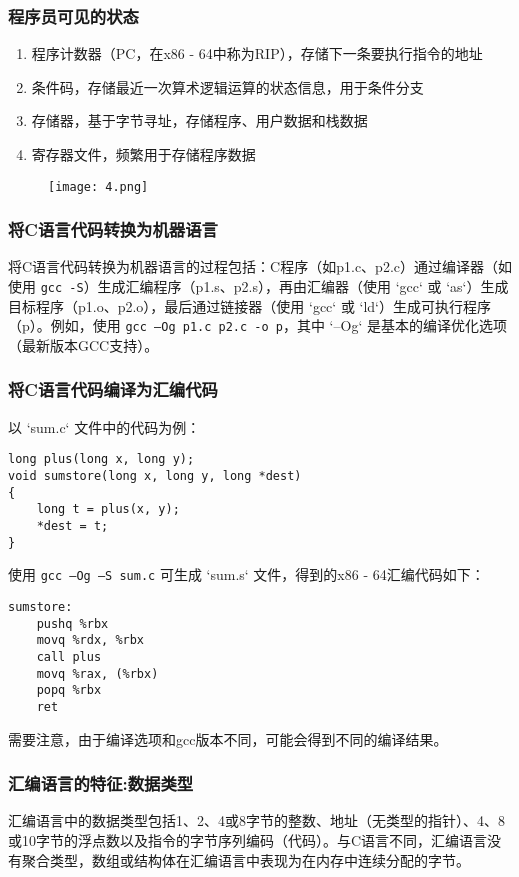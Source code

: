 \subsubsection{程序员可见的状态}
\begin{enumerate}
    \item 程序计数器（PC，在x86 - 64中称为RIP），存储下一条要执行指令的地址
    \item 条件码，存储最近一次算术逻辑运算的状态信息，用于条件分支
    \item 存储器，基于字节寻址，存储程序、用户数据和栈数据
    \item 寄存器文件，频繁用于存储程序数据
\end{enumerate}

\begin{figure}[H]
    \centering
    \captionsetup{skip=4pt}
    \texttt{[image: 4.png]}
    \caption{} 
\end{figure}

\subsubsection{将C语言代码转换为机器语言}
将C语言代码转换为机器语言的过程包括：C程序（如p1.c、p2.c）通过编译器（如使用 \texttt{gcc -S}）生成汇编程序（p1.s、p2.s），再由汇编器（使用 `gcc` 或 `as`）生成目标程序（p1.o、p2.o），最后通过链接器（使用 `gcc` 或 `ld`）生成可执行程序（p）。例如，使用 \texttt{gcc –Og p1.c p2.c -o p}，其中 `–Og` 是基本的编译优化选项（最新版本GCC支持）。

\subsubsection{将C语言代码编译为汇编代码}
以 `sum.c` 文件中的代码为例：
\begin{verbatim}
long plus(long x, long y); 
void sumstore(long x, long y, long *dest)
{
    long t = plus(x, y); 
    *dest = t;
}
\end{verbatim}
使用 \texttt{gcc –Og –S sum.c} 可生成 `sum.s` 文件，得到的x86 - 64汇编代码如下：
\begin{verbatim}
sumstore:
    pushq %rbx
    movq %rdx, %rbx
    call plus
    movq %rax, (%rbx)
    popq %rbx
    ret
\end{verbatim}
需要注意，由于编译选项和gcc版本不同，可能会得到不同的编译结果。

\subsubsection{汇编语言的特征:数据类型}
汇编语言中的数据类型包括1、2、4或8字节的整数、地址（无类型的指针）、4、8或10字节的浮点数以及指令的字节序列编码（代码）。与C语言不同，汇编语言没有聚合类型，数组或结构体在汇编语言中表现为在内存中连续分配的字节。

